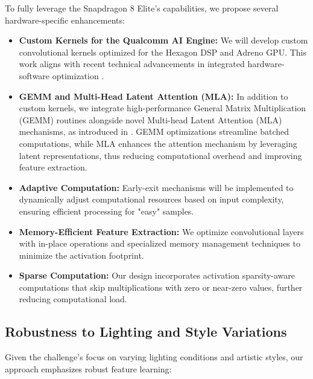 \documentclass[11pt, oneside]{article}   	%
\begin{document}
To fully leverage the Snapdragon 8 Elite's capabilities, we propose several hardware-specific enhancements:

\begin{itemize}
	\item \textbf{Custom Kernels for the Qualcomm AI Engine:} We will develop custom convolutional kernels optimized for the Hexagon DSP and Adreno GPU. This work aligns with recent technical advancements in integrated hardware-software optimization \cite{deepseekai2025deepseekv3technicalreport}.
	
	\item \textbf{GEMM and Multi-Head Latent Attention (MLA):} In addition to custom kernels, we integrate high-performance General Matrix Multiplication (GEMM) routines alongside novel Multi-head Latent Attention (MLA) mechanisms, as introduced in \cite{deepseekai2025deepseekv3technicalreport}. GEMM optimizations streamline batched computations, while MLA enhances the attention mechanism by leveraging latent representations, thus reducing computational overhead and improving feature extraction.
	
	\item \textbf{Adaptive Computation:} Early-exit mechanisms will be implemented to dynamically adjust computational resources based on input complexity, ensuring efficient processing for "easy" samples.
	
	\item \textbf{Memory-Efficient Feature Extraction:} We optimize convolutional layers with in-place operations and specialized memory management techniques to minimize the activation footprint.
	
	\item \textbf{Sparse Computation:} Our design incorporates activation sparsity-aware computations that skip multiplications with zero or near-zero values, further reducing computational load.
\end{itemize}

\subsection*{Robustness to Lighting and Style Variations}

Given the challenge’s focus on varying lighting conditions and artistic styles, our approach emphasizes robust feature learning:
\end{document}

